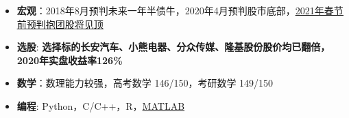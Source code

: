   \begin{itemize}[leftmargin=*]
    \item \textbf{宏观}：2018年8月预判未来一年半债牛，2020年4月预判股市底部，\href{https://xueqiu.com/1376056330/172009168}{\underline{2021年春节前预判抱团股将见顶}}
    \item \textbf{选股}: \textbf{选择标的长安汽车、小熊电器、分众传媒、隆基股份股价均已翻倍，2020年实盘收益率126\%}
    \item \textbf{数学}：数理能力较强，高考数学 146/150，考研数学 149/150
    \item \textbf{编程}: Python，C/C++，R，\href{https://www.mathworks.com/}{MATLAB}
  \end{itemize}